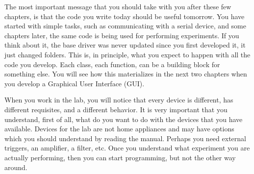 The most important message that you should take with you after these few
chapters, is that the code you write today should be useful tomorrow.
You have started with simple tasks, such as communicating with a serial
device, and some chapters later, the same code is being used for
performing experiments. If you think about it, the base driver was never
updated since you first developed it, it just changed folders. This is,
in principle, what you expect to happen with all the code you develop.
Each class, each function, can be a building block for something else.
You will see how this materializes in the next two chapters when you
develop a Graphical User Interface ({GUI}).

When you work in the lab, you will notice that every device is
different, has different requisites, and a different behavior. It is
very important that you understand, first of all, what do you want to do
with the devices that you have available. Devices for the lab are not
home appliances and may have options which you should understand by
reading the manual. Perhaps you need external triggers, an amplifier, a
filter, etc. Once you understand what experiment you are actually
performing, then you can start programming, but not the other
way around.
